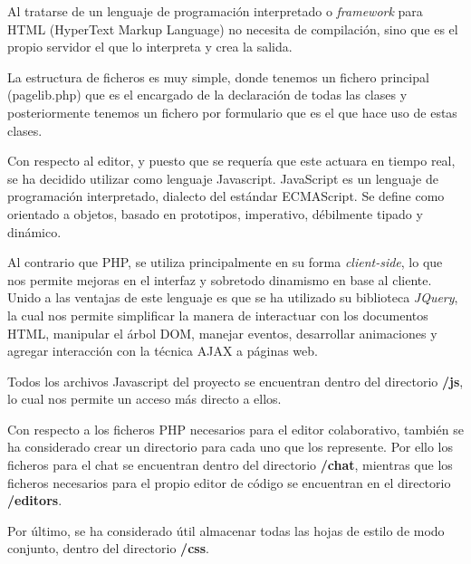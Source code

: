 Al tratarse de un lenguaje de programación interpretado o \emph{framework} para HTML (HyperText Markup Language) no necesita de compilación, sino que es el propio servidor el que lo interpreta y crea la salida. 

La estructura de ficheros es muy simple, donde tenemos un fichero principal (pagelib.php) que es el encargado de la declaración de todas las clases y posteriormente tenemos un fichero por formulario que es el que hace uso de estas clases.

Con respecto al editor, y puesto que se requería que este actuara en tiempo real, se ha decidido utilizar como lenguaje Javascript. JavaScript es un lenguaje de programación interpretado, dialecto del estándar ECMAScript. Se define como orientado a objetos, basado en prototipos, imperativo, débilmente tipado y dinámico.

Al contrario que PHP, se utiliza principalmente en su forma \emph{client-side}, lo que nos permite mejoras en el interfaz y sobretodo dinamismo en base al cliente. Unido a las ventajas de este lenguaje es que se ha utilizado su biblioteca \emph{JQuery}, la cual nos permite simplificar la manera de interactuar con los documentos HTML, manipular el árbol DOM, manejar eventos, desarrollar animaciones y agregar interacción con la técnica AJAX a páginas web.

Todos los archivos Javascript del proyecto se encuentran dentro del directorio \textbf{/js}, lo cual nos permite un acceso más directo a ellos. 

Con respecto a los ficheros PHP necesarios para el editor colaborativo, también se ha considerado crear un directorio para cada uno que los represente. Por ello los ficheros para el chat se encuentran dentro del directorio \textbf{/chat}, mientras que los ficheros necesarios para el propio editor de código se encuentran en el directorio \textbf{/editors}.

Por último, se ha considerado útil almacenar todas las hojas de estilo de modo conjunto, dentro del directorio \textbf{/css}.